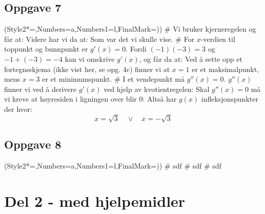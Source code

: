\subsection*{Oppgave 7}
\begin{easylist}[enumerate]
	\ListProperties(Style2*=,Numbers=a,Numbers1=l,FinalMark={)})
	# Vi bruker kjerneregelen og får at:
Videre har vi da at:
Som var det vi skulle vise.
	# For $ x $-verdien til toppunkt og bunnpunkt er $ g'(x)=0 $. Fordi $ (-1)(-3)=3 $ og $ -1+(-3)=-4 $ kan vi omskrive $ g'(x) $, og får da at:
Ved å sette opp et fortegnsskjema (ikke vist her, se opg. 4c) finner vi at $ x=1 $ er et maksimalpunkt, mens $ x=3 $ er et minimumspunkt.
	# I et vendepunkt må $ g''(x)=0 $. $ g''(x) $ finner vi ved å derivere $ g'(x) $ ved hjelp av kvotientregelen:
Skal $ g''(x)=0 $ må vi kreve at høyresiden i ligningen over blir 0:
Altså har $ g(x) $ infleksjonspunkter der hvor:
\[ x = \sqrt{3} \quad \vee\quad x=-\sqrt{3} \]

\end{easylist}


\subsection*{Oppgave 8}
\begin{easylist}[enumerate]
	\ListProperties(Style2*=,Numbers=a,Numbers1=l,FinalMark={)})
	# sdf
	# sdf
	# sdf
\end{easylist}







\clearpage 
\section*{Del 2 - med hjelpemidler}


